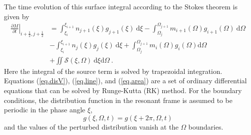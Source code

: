 The time evolution of this surface integral according to the Stokes theorem is given by
\begin{equation}\label{eq.area}
    \begin{aligned}
         \left.\frac{\partial M}{\partial t}\right|_{i+\frac{1}{2},j+\frac{1}{2}}
         &= \int_{\xi_i}^{\xi_{i+1}} n_{j+1}(\xi) g_{j+1}(\xi)~\mathrm{d}\xi - \int_{\Omega_j}^{\Omega_{j+1}} m_{i+1}(\Omega) g_{i+1} (\Omega)~\mathrm{d} \Omega \\
        & - \int_{\xi_i}^{\xi_{i+1}} n_{j}(\xi) g_{j}(\xi)~\mathrm{d}\xi + \int_{\Omega_j}^{\Omega_{j+1}} m_{i}(\Omega) g_{i} (\Omega) \mathrm{d}\Omega \\
        &+ \iint \mathcal{S}(\xi,\Omega)~\mathrm{d}\xi\mathrm{d}\Omega~.
    \end{aligned}
\end{equation}
Here the integral of the source term is solved by trapezoidal integration.
Equations (\ref{eq.disV}), (\ref{eq.line}), and (\ref{eq.area})
are a set of ordinary differential equations that can be solved  by Runge-Kutta (RK) method.
For the boundary conditions, 
the distribution function 
in  the resonant frame
is assumed to be periodic in the phase angle $\xi$,
\begin{equation}
    g\left(\xi,\Omega,t\right)=g\left(\xi+2 \pi,\Omega,t\right)
\end{equation}
and
the values of the perturbed distribution vanish at the $\Omega$ boundaries.

